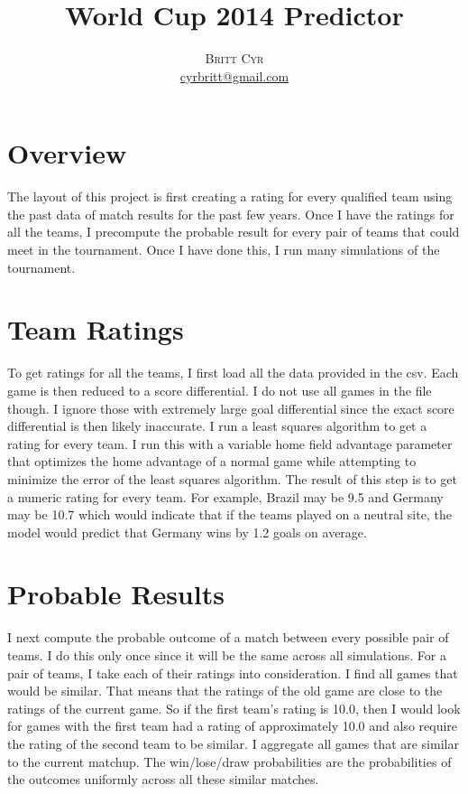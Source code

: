\documentclass[twoside]{article}
\title{\vspace{-15mm}\fontsize{24pt}{10pt}\selectfont\textbf{World Cup 2014 Predictor}} %
\author{
\large
\textsc{Britt Cyr}
\\ %
\normalsize \href{mailto:cyrbritt@gmail.com}{cyrbritt@gmail.com} %
\vspace{-5mm}
}
\date{}
\begin{document}
\maketitle %


\begin{multicols}{2} %



\section{Overview}
The layout of this project is first creating a rating for every qualified team
using the past data of match results for the past few years. Once I have the ratings for
all the teams, I precompute the probable result for every pair of teams that could meet in
the tournament. Once I have done this, I run many simulations of the tournament.

\section{Team Ratings}
To get ratings for all the teams, I first load all the data provided in the csv. Each
game is then reduced to a score differential. 
I do not use all games in the file though. I ignore those with extremely large goal
differential since the exact score differential is then likely inaccurate.
I run a least squares algorithm to 
get a rating for every team. I run this with a variable home field advantage parameter
that optimizes the home advantage of a normal game while attempting to minimize the
error of the least squares algorithm. The result of this step is to get a numeric rating
for every team. For example, Brazil may be 9.5 and Germany may be 10.7 which would indicate
that if the teams played on a neutral site, the model would predict that Germany wins
by 1.2 goals on average.

\section{Probable Results}
I next compute the probable outcome of a match between every possible pair of teams.
I do this only once since it will be the same across all simulations. For a pair of teams,
I take each of their ratings into consideration. I find all games that would be similar. That
means that the ratings of the old game are close to the ratings of the current game. So
if the first team's rating is 10.0, then I would look for games with the first team had a
rating of approximately 10.0 and also require the rating of the second team to be similar.
I aggregate all games that are similar to the current matchup. The 
win/lose/draw probabilities are the
probabilities of the outcomes uniformly across all these similar matches.


\end{multicols}
\end{document}
